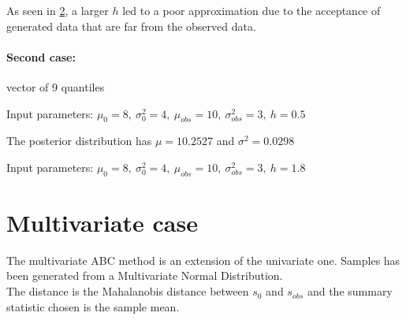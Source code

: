 \documentclass[11pt,a4paper,oneside]{report}
\begin{document}
\begin{figure}[h!]
	\centering
	\caption{}
	\label{abch18}
\end{figure}
\begin{figure}[h!]
	\centering
	\caption{}
	\label{abch18}
\end{figure}


As seen in \ref{abch18}, a larger $h$ led to a poor approximation due to the acceptance of generated data that are far from the observed data.

\paragraph{Second case:} vector of 9 quantiles 
\begin{center} Input parameters: $\mu_{0}=8,\  \sigma_{0}^2=4,\  \mu_{obs}=10,\  \sigma_{obs}^2 =3,\ h=0.5$  \end{center}


\begin{figure}[h!]
	\centering
	\caption{}
\end{figure}
\begin{figure}[h!]
	\centering
	\caption{}
\end{figure}


The posterior distribution has $\mu=10.2527$ and $\sigma^2=0.0298$ 
\begin{center} Input parameters: $\mu_{0}=8,\  \sigma_{0}^2=4,\  \mu_{obs}=10,\  \sigma_{obs}^2 =3,\ h=1.8$  \end{center}
\begin{figure}[h!]
	\centering
	\caption{}
\end{figure}
\begin{figure}[h!]
	\centering
	\caption{}
\end{figure}

\section{Multivariate case}
The multivariate ABC method is an extension of the univariate one. Samples has been generated from a Multivariate Normal Distribution.\\
The distance is the Mahalanobis distance between  $s_{0}$ and $s_{obs}$ and the summary statistic chosen is the sample mean.
\end{document}
